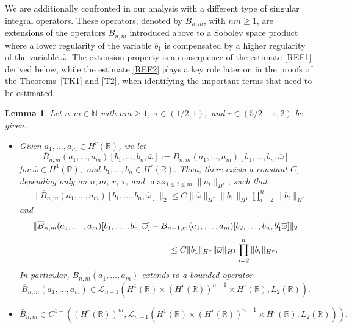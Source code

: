 \documentclass[11pt,reqno]{amsart}
\numberwithin{equation}{section}
\newcommand{\0}{\Omega}
\newcommand{\ov}{\overline}
\newcommand{\oo}{\ov\omega}
\newcommand{\kL}{\mathcal{L}}
\newcommand{\R}{\mathbb{R}}
\newcommand{\N}{\mathbb{N}}
\newtheorem{lemma}[thm]{Lemma}
\numberwithin{equation}{section}
\begin{document}
 We are additionally confronted in our analysis with a different type of singular integral operators. 
 These operators, denoted by $\ov B_{n,m}$, with $nm\geq1$,
 are  extensions of the operators $B_{n,m}$ introduced above
to a   Sobolev space product where a lower regularity of the  variable $b_1$ is compensated  by a higher regularity of the variable $\oo$.
The extension property is a consequence of the estimate \eqref{REF1} derived below, while the estimate  \eqref{REF2} plays a key role  later on 
in the proofs of the Theorems~\ref{TK1} and \ref{T2}, when identifying the important terms that need to be estimated.



\begin{lemma}\label{L:99d}
 Let  $ n,m\in\N$ with $nm\geq1,$    $\tau\in (1/2,1),$ and $r\in(5/2-\tau,2) $  be given.  
 \begin{itemize}
  \item[$(i)$] Given $a_1,\ldots, a_{m}\in H^r(\R)$,     we let
  \[
  \ov B_{n,m}(a_1,\ldots, a_{m})[b_1,\ldots, b_n,\oo]:=B_{n,m}(a_1,\ldots, a_{m})[b_1,\ldots, b_n,\oo]
  \]
  for $\oo\in H^1(\R),$ and $ b_1,\ldots, b_n\in H^r(\R).$
  Then, there exists a constant  $C$, depending only on $n,m$, $r$, $\tau$,  and $\max_{1\leq i\leq m}\|a_i\|_{H^r}$, such that
\begin{align} 
&\|\ov B_{n,m}(a_1,\ldots, a_{m})[b_1,\ldots, b_n,\oo]\|_2\leq C\|\oo\|_{H^\tau}\|b_1\|_{H^1}\prod_{i=2}^n\|b_i\|_{H^r} \label{REF1}
\end{align}
and
\begin{align} 
&\|\ov B_{n,m}(a_1,\ldots, a_{m})[b_1,\ldots, b_n,\oo]-B_{n-1,m}(a_1,\ldots, a_{m})[b_2,\ldots, b_n,b_1'\oo]\|_2\nonumber\\[1ex]
&\hspace{5.6cm}\leq C\|b_1\|_{H^{\tau}}\|\oo\|_{H^1}\prod_{i=2}^n\|b_i\|_{H^r}.\label{REF2}
\end{align}
In particular,  $\ov B_{n,m}(a_{1}, \ldots, a_{m})$ extends to a bounded operator   
$$\ov B_{n,m}(a_{1}, \ldots, a_{m}) \in\kL_{n+1}(H^1(\R)\times  (H^r(\R))^{n-1}\times H^{\tau}(\R), L_2(\R)).$$
  \item[$(ii)$]  $\ov B_{n,m}\in C^{1-}((H^r(\R))^m,\kL_{n+1}(H^1(\R)\times (H^{r}(\R))^{n-1}\times H^{\tau}(\R), L_2(\R))).$
 \end{itemize}  
 \end{lemma}
\end{document}

